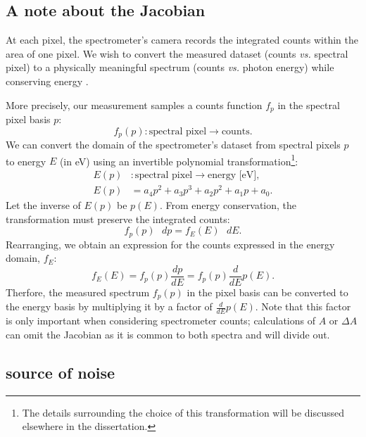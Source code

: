 \subsection{A note about the Jacobian}

At each pixel, the spectrometer's camera records the integrated counts within the area of one pixel. We wish to convert the measured dataset (counts \textit{vs.} spectral pixel) to a physically meaningful spectrum (counts \textit{vs.} photon energy) while conserving energy \cite{mooneyGetBasicsRight2013}.

More precisely, our measurement samples a counts function $f_p$ in the spectral pixel basis $p$:
\begin{equation}
f_p (p): \text{spectral pixel} \rightarrow \text{counts}.
\end{equation}
We can convert the domain of the spectrometer's dataset from spectral pixels $p$ to energy $E$ (in eV) using an invertible polynomial transformation\footnote{The details surrounding the choice of this transformation will be discussed elsewhere in the dissertation.}:
\begin{equation}
\begin{aligned}
E(p)&: \text{spectral pixel} \rightarrow \text{energy [eV]}, \\
E(p) &= a_4 p^2 + a_3 p^3 + a_2 p^2 + a_1 p + a_0.
\end{aligned}
\end{equation}
Let the inverse of $E(p)$ be $p(E)$. From energy conservation, the transformation must preserve the integrated counts:
\begin{equation}
f_p(p) \text{ } dp = f_E(E) \text{ } dE.
\end{equation}
Rearranging, we obtain an expression for the counts expressed in the energy domain, $f_E$:
\begin{equation}
f_E (E) = f_p (p) \frac{dp}{dE} = f_p(p) \frac{d}{dE} p(E).
\label{eqn:spectrometer_jacobian}
\end{equation}
Therfore, the measured spectrum $f_p(p)$ in the pixel basis can be converted to the energy basis by multiplying it by a factor of $\frac{d}{dE} p(E)$. Note that this factor is only important when considering spectrometer counts; calculations of $A$ or $\Delta A$ can omit the Jacobian as it is common to both spectra and will divide out.

\subsection{source of noise}

